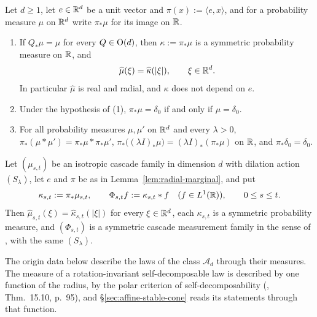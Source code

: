 \begin{lemma}\label{lem:radial-marginal}
Let $d \ge 1$, let $e \in \mathbb{R}^d$ be a unit vector and $\pi(x) := \langle e, x\rangle$, and for a
probability measure $\mu$ on $\mathbb{R}^d$ write $\pi_*\mu$ for its image on $\mathbb{R}$.
\begin{enumerate}
\item If $Q_*\mu = \mu$ for every $Q \in \mathrm{O}(d)$, then $\kappa := \pi_*\mu$ is a symmetric
probability measure on $\mathbb{R}$, and
\[
  \widehat\mu(\xi) = \widehat\kappa(|\xi|), \qquad \xi \in \mathbb{R}^d .
\]
In particular $\widehat\mu$ is real and radial, and $\kappa$ does not depend on $e$.
\item Under the hypothesis of (1), $\pi_*\mu = \delta_0$ if and only if $\mu = \delta_0$.
\item For all probability measures $\mu, \mu'$ on $\mathbb{R}^d$ and every $\lambda > 0$,
$\pi_*(\mu * \mu') = \pi_*\mu * \pi_*\mu'$, $\pi_*\bigl((\lambda I)_*\mu\bigr) =
(\lambda I)_*(\pi_*\mu)$ on $\mathbb{R}$, and $\pi_*\delta_0 = \delta_0$.
\end{enumerate}
\end{lemma}

\begin{lemma}\label{lem:isotropic-marginal-family}
Let $(\mu_{s,t})$ be an isotropic cascade family in dimension $d$ with dilation action
$(S_\lambda)$, let $e$ and $\pi$ be as in Lemma~\ref{lem:radial-marginal}, and put
\[
  \kappa_{s,t} := \pi_*\mu_{s,t}, \qquad \Phi_{s,t}f := \kappa_{s,t} * f
  \quad (f \in L^1(\mathbb{R})), \qquad 0 \le s \le t .
\]
Then $\widehat\mu_{s,t}(\xi) = \widehat\kappa_{s,t}(|\xi|)$ for every $\xi \in \mathbb{R}^d$, each
$\kappa_{s,t}$ is a symmetric probability measure, and $(\Phi_{s,t})$ is a symmetric cascade
measurement family in the sense of , with the same $(S_\lambda)$.
\end{lemma}

The origin data below describe the laws of the class $\mathcal A_d$ through their \Levy{} measures.
The \Levy{} measure of a rotation-invariant self-decomposable law is described by one function of
the radius, by the polar criterion of self-decomposability (, Thm.~15.10,
p.~95), and \S\ref{sec:affine-stable-cone} reads its statements through that function.

